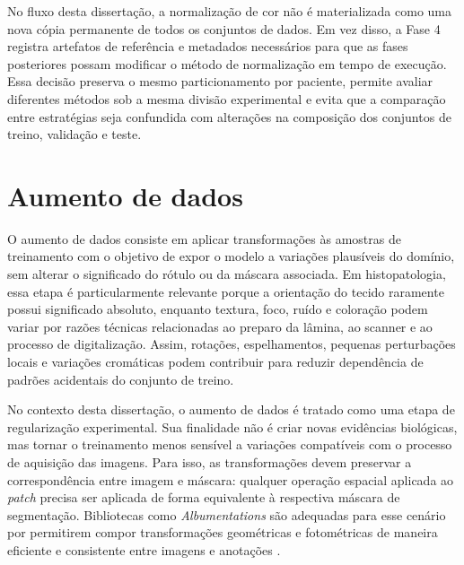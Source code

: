 No fluxo desta dissertação, a normalização de cor não é materializada como uma
nova cópia permanente de todos os conjuntos de dados. Em vez disso, a Fase 4
registra artefatos de referência e metadados necessários para que as fases
posteriores possam modificar o método de normalização em tempo de execução. Essa decisão preserva o mesmo particionamento por paciente, permite avaliar diferentes métodos sob a mesma divisão experimental e evita que a comparação entre estratégias seja confundida com alterações na composição dos conjuntos de treino, validação e teste.

\section{Aumento de dados}\label{sec:aumento_dados}

O aumento de dados consiste em aplicar transformações às amostras de treinamento
com o objetivo de expor o modelo a variações plausíveis do domínio, sem alterar
o significado do rótulo ou da máscara associada. Em histopatologia, essa etapa é
particularmente relevante porque a orientação do tecido raramente possui
significado absoluto, enquanto textura, foco, ruído e coloração podem variar por
razões técnicas relacionadas ao preparo da lâmina, ao scanner e ao processo de
digitalização. Assim, rotações, espelhamentos, pequenas perturbações locais e
variações cromáticas podem contribuir para reduzir dependência de padrões
acidentais do conjunto de treino.

No contexto desta dissertação, o aumento de dados é tratado como uma etapa de
regularização experimental. Sua finalidade não é criar novas evidências
biológicas, mas tornar o treinamento menos sensível a variações compatíveis com
o processo de aquisição das imagens. Para isso, as transformações devem preservar
a correspondência entre imagem e máscara: qualquer operação espacial aplicada ao
\textit{patch} precisa ser aplicada de forma equivalente à respectiva máscara de
segmentação. Bibliotecas como \textit{Albumentations} são adequadas para esse cenário por
permitirem compor transformações geométricas e fotométricas de maneira eficiente
e consistente entre imagens e anotações
\cite{buslaev2020albumentations,dossantos2023augmentation,shorten2019survey}.

